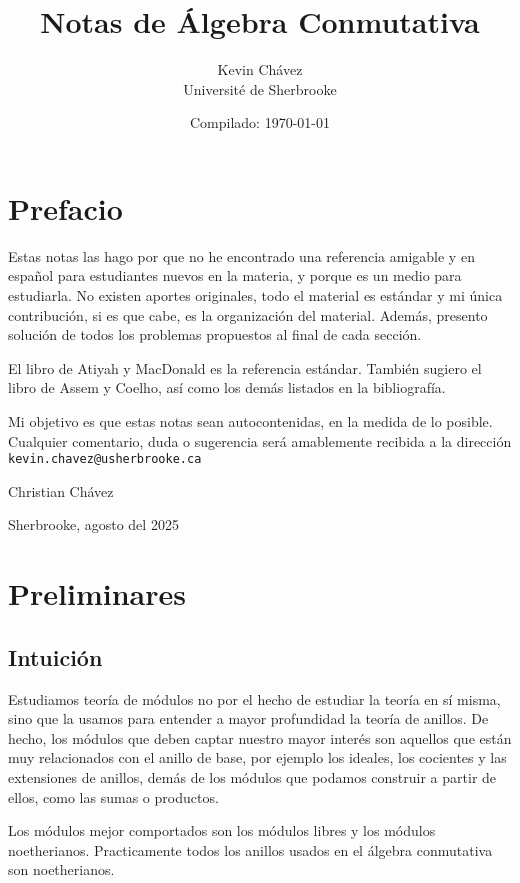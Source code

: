\documentclass[b5paper,10pt]{book}
\title{Notas de Álgebra Conmutativa}
\author{Kevin Chávez\\ Université de Sherbrooke}
\date{Compilado: \today}
\begin{document}
\pagestyle{empty}
\maketitle 
\tableofcontents
\pagestyle{plain}

\chapter*{Prefacio}

Estas notas las hago por que no he encontrado una referencia
amigable y en español para estudiantes nuevos en la materia,
y porque es un medio para estudiarla.
No existen aportes originales, todo el material es estándar
y mi única contribución, si es que cabe, es la organización 
del material.
Además, presento solución de todos los problemas propuestos 
al final de cada sección.

El libro de Atiyah y MacDonald es la referencia estándar.
También sugiero el libro de Assem y Coelho,
así como los demás listados en la bibliografía.

Mi objetivo es que estas notas sean autocontenidas,
en la medida de lo posible.
Cualquier comentario, duda o sugerencia será
amablemente recibida a la dirección
\texttt{kevin.chavez@usherbrooke.ca}

\hfill Christian Chávez

\hfill Sherbrooke, agosto del 2025
\chapter{Preliminares}

\section{Intuición}

Estudiamos teoría de módulos no por el hecho de estudiar la teoría en sí misma,
sino que la usamos para entender a mayor profundidad la teoría de anillos.
De hecho, los módulos que deben captar nuestro mayor interés 
son aquellos que están muy relacionados con el anillo de base,
por ejemplo los ideales, los cocientes y las extensiones de anillos,
demás de los módulos que podamos construir a partir de ellos, como las sumas o productos.

Los módulos mejor comportados son los módulos libres
y los módulos noetherianos.
Practicamente todos los anillos usados en el álgebra conmutativa son
noetherianos.
\end{document}
